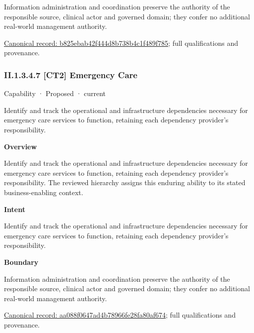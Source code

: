 Information administration and coordination preserve the authority of the responsible source, clinical actor and governed domain; they confer no additional real-world management authority.


{\footnotesize \href{../../../../continuum/strategy/capability/b825ebab42f444d8b738b4c1f489f785.md}{Canonical record: b825ebab42f444d8b738b4c1f489f785}; full qualifications and provenance.}\par
\subsubsection*{II.1.3.4.7 [CT2] Emergency Care}
\label{navigation:II.1.3.4.7}

\label{element:aa088f0647ad4b78966fe28fa80af674}
{\small Capability · Proposed · current}\par

Identify and track the operational and infrastructure dependencies necessary for emergency care services to function, retaining each dependency provider's responsibility.



\textbf{Overview}



Identify and track the operational and infrastructure dependencies necessary for emergency care services to function, retaining each dependency provider's responsibility. The reviewed hierarchy assigns this enduring ability to its stated business-enabling context.



\textbf{Intent}



Identify and track the operational and infrastructure dependencies necessary for emergency care services to function, retaining each dependency provider's responsibility.



\textbf{Boundary}



Information administration and coordination preserve the authority of the responsible source, clinical actor and governed domain; they confer no additional real-world management authority.


{\footnotesize \href{../../../../continuum/strategy/capability/aa088f0647ad4b78966fe28fa80af674.md}{Canonical record: aa088f0647ad4b78966fe28fa80af674}; full qualifications and provenance.}\par
